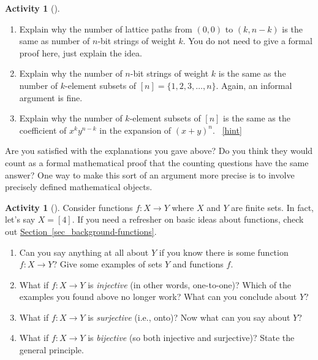 \documentclass[10pt,]{book}
\theoremstyle{plain}
\theoremstyle{definition}
\theoremstyle{definition}
\theoremstyle{definition}
\newtheorem{activity}[project]{Activity}
\numberwithin{equation}{chapter}
\begin{document}
\begin{activity}[]\label{activity-61}
\leavevmode%
\begin{enumerate}[font=\bfseries,label=(\alph*),ref=\alph*]
\item\label{task-90} \hypertarget{p-510}{}%
Explain why the number of lattice paths from \((0,0)\) to \((k,n-k)\) is the same as number of \(n\)-bit strings of weight \(k\). You do not need to give a formal proof here, just explain the idea.%
\item\label{task-91} \hypertarget{p-511}{}%
Explain why the number of \(n\)-bit strings of weight \(k\) is the same as the number of \(k\)-element subsets of \([n] = \{1,2,3,\ldots, n\}\).   Again, an informal argument is fine.%
\item\label{task-92} \hypertarget{p-512}{}%
Explain why the number of \(k\)-element subsets of \([n]\) is the same as the coefficient of \(x^ky^{n-k}\) in the expansion of \((x+y)^n\).%
~\hfill{\tiny\hyperlink{a-68.c}{[hint]}\hypertarget{q-68.c}{}}\end{enumerate}
\end{activity}
\hypertarget{p-514}{}%
Are you satisfied with the explanations you gave above?  Do you think they would count as a formal mathematical proof that the counting questions have the same answer?  One way to make this sort of an argument more precise is to involve precisely defined mathematical objects.%
\begin{activity}[]\label{activity-62}
\hypertarget{p-515}{}%
Consider functions \(f:X \to Y\) where \(X\) and \(Y\) are finite sets.  In fact, let's say \(X = [4]\). If you need a refresher on basic ideas about functions, check out \hyperref[sec_background-functions]{Section~\ref{sec_background-functions}}.%
\begin{enumerate}[font=\bfseries,label=(\alph*),ref=\alph*]
\item\label{task-93} \hypertarget{p-516}{}%
Can you say anything at all about \(Y\) if you know there is some function \(f:X \to Y\)?  Give some examples of sets \(Y\) and functions \(f\).%
\item\label{task-94} \hypertarget{p-517}{}%
What if \(f:X \to Y\) is \emph{injective} (in other words, one-to-one)?  Which of the examples you found above no longer work?  What can you conclude about \(Y\)?%
\item\label{task-95} \hypertarget{p-518}{}%
What if \(f:X \to Y\) is \emph{surjective} (i.e., onto)?  Now what can you say about \(Y\)?%
\item\label{task-96} \hypertarget{p-519}{}%
What if \(f:X\to Y\) is \emph{bijective} (so both injective and surjective)?  State the general principle.%
\end{enumerate}
\end{activity}
\end{document}
